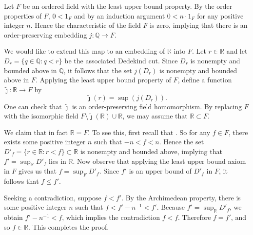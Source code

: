 \documentclass[12pt]{article}
\begin{document}
Let $F$ be an ordered field with the least upper bound property.  By the 
order properties of $F$, $0 < 1_F$ and by an induction argument $0 < n\cdot 1_F$ 
for any positive integer $n$.  Hence the characteristic of the field $F$ is 
zero, implying that there is an order-preserving embedding $j\colon \mathbb{Q}\to F$.

We would like to extend this map to an embedding of $\mathbb{R}$ into $F$.  Let $r\in\mathbb{R}$
and let $D_r = \{ q \in\mathbb{Q}\colon q < r \}$ be the associated Dedekind cut.  Since $D_r$ is 
nonempty and bounded above in $\mathbb{Q}$, it follows that the set $j(D_r)$ is nonempty and
bounded above in $F$.  Applying the least upper bound property of $F$, define a function
$\widetilde{\jmath}\colon\mathbb{R}\to F$ by
\[
\widetilde{\jmath}(r) = \sup\left(j(D_r)\right).
\]
One can check that $\widetilde{\jmath}$ is an order-preserving field homomorphism.  
By replacing $F$ with the isomorphic field $F\setminus\widetilde{\jmath}(\mathbb{R})\cup\mathbb{R}$,
we may assume that $\mathbb{R}\subset F$.

We claim that in fact $\mathbb{R}=F$.  To see this, first recall that 
.
So for any $f\in F$, there exists some positive integer $n$ such that $-n < f < n$.
Hence the set
$D'_f = \{ r\in\mathbb{R} \colon r < f \}\subset\mathbb{R}$ is nonempty and
bounded above, implying that $f' = \sup_{\mathbb{R}} D'_f$ lies in $\mathbb{R}$.
Now observe that applying the least upper bound axiom in $F$ gives us that
$f = \sup_F D'_f$.  Since $f'$ is an upper bound of $D'_f$ in $F$, it follows
that $f\le f'$.

Seeking a contradiction, suppose $f<f'$.  By the Archimedean property,
there is some positive integer $n$ such that $f<f'-n^{-1}<f'$.  Because
$f'=\sup_{\mathbb{R}} D'_f$, we obtain $f'-n^{-1}<f$, which implies the 
contradiction
$f<f$.  Therefore $f=f'$, and so $f\in\mathbb{R}$.  This completes the proof.


\end{document}
